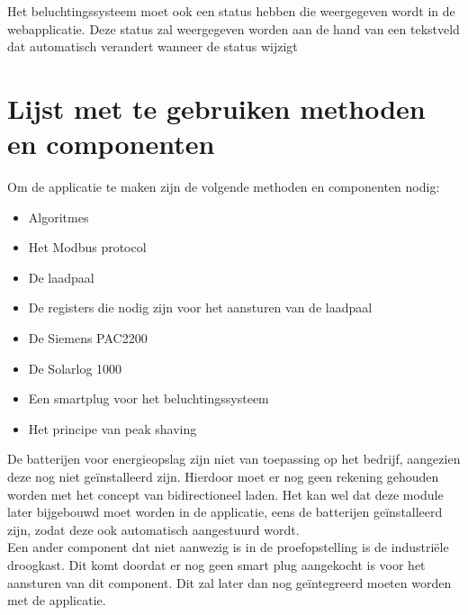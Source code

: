 Het beluchtingssysteem moet ook een status hebben die weergegeven wordt in de webapplicatie. Deze status zal weergegeven worden aan de hand van een tekstveld dat automatisch verandert wanneer de status wijzigt

\section{Lijst met te gebruiken methoden en componenten}
\label{sec:lijst-met-te-gebruiken-methoden-en-componenten}

Om de applicatie te maken zijn de volgende methoden en componenten nodig:

\begin{itemize}
    \item Algoritmes
    \item Het Modbus protocol
    \item De laadpaal
    \item De registers die nodig zijn voor het aansturen van de laadpaal
    \item De Siemens PAC2200
    \item De Solarlog 1000
    \item Een smartplug voor het beluchtingssysteem
    \item Het principe van peak shaving
\end{itemize}

De batterijen voor energieopslag zijn niet van toepassing op het bedrijf, aangezien deze nog niet geïnstalleerd zijn. Hierdoor moet er nog geen rekening gehouden worden met het concept van bidirectioneel laden. Het kan wel dat deze module later bijgebouwd moet worden in de applicatie, eens de batterijen geïnstalleerd zijn, zodat deze ook automatisch aangestuurd wordt.\\

Een ander component dat niet aanwezig is in de proefopstelling is de industriële droogkast. Dit komt doordat er nog geen smart plug aangekocht is voor het aansturen van dit component. Dit zal later dan nog geïntegreerd moeten worden met de applicatie.